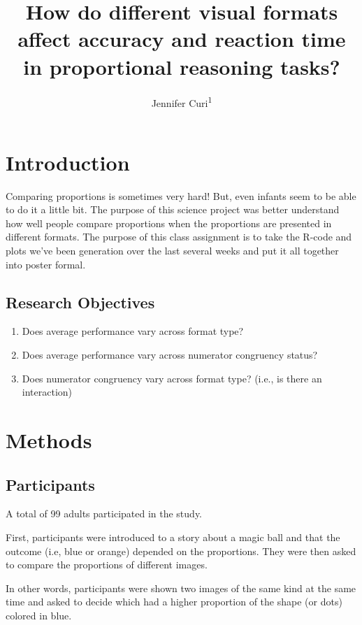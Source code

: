 \documentclass[
  man,floatsintext]{apa6}
\title{How do different visual formats affect accuracy and reaction time in proportional reasoning tasks?}
\author{Jennifer Curi\textsuperscript{1}}
\date{}
\affiliation{\vspace{0.5cm}\textsuperscript{1} Rutgers University}
\providecommand{\tightlist}{%
  \setlength{\itemsep}{0pt}\setlength{\parskip}{0pt}}
\begin{document}
\maketitle

\section{Introduction}\label{introduction}

Comparing proportions is sometimes very hard! But, even infants seem to be able to do it a little bit. The purpose of this science project was better understand how well people compare proportions when the proportions are presented in different formats. The purpose of this class assignment is to take the R-code and plots we've been generation over the last several weeks and put it all together into poster formal.

\subsection{Research Objectives}\label{research-objectives}

\begin{enumerate}
\def\labelenumi{\arabic{enumi}.}
\tightlist
\item
  Does average performance vary across format type?
\item
  Does average performance vary across numerator congruency
  status?
\item
  Does numerator congruency vary across format type? (i.e., is
  there an interaction)
\end{enumerate}

\section{Methods}\label{methods}

\subsection{Participants}\label{participants}

A total of 99 adults participated in the study.

First, participants were introduced to a story about a magic ball and that the outcome (i.e, blue or orange) depended on the proportions. They were then asked to compare the proportions of different images.

In other words, participants were shown two images of the same kind at the same time and asked to decide which had a higher proportion of the shape (or dots) colored in blue.
\end{document}
